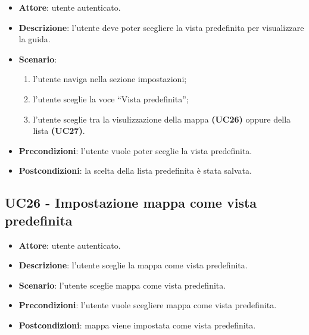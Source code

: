 \begin{itemize}
    \item \textbf{Attore}: utente autenticato.
    \item \textbf{Descrizione}: l'utente deve poter scegliere la vista predefinita per visualizzare la guida.
    \item \textbf{Scenario}:
    \begin{enumerate}
        \item l'utente naviga nella sezione impostazioni;
        \item l'utente sceglie la voce “Vista predefinita”;
        \item l'utente sceglie tra la visulizzazione della mappa \textbf{(UC26)} oppure della lista \textbf{(UC27)}.
    \end{enumerate}

    \item \textbf{Precondizioni}: l'utente vuole poter sceglie la vista predefinita.
    \item \textbf{Postcondizioni}: la scelta della lista predefinita è stata salvata.
\end{itemize}

\subsection{UC26 - Impostazione mappa come vista predefinita}
\begin{itemize}
    \item \textbf{Attore}: utente autenticato.
    \item \textbf{Descrizione}: l'utente sceglie la mappa come vista predefinita.
    \item \textbf{Scenario}: l'utente sceglie mappa come vista predefinita.
    \item \textbf{Precondizioni}: l'utente vuole scegliere mappa come vista predefinita.
    \item \textbf{Postcondizioni}: mappa viene impostata come vista predefinita.

\end{itemize}

